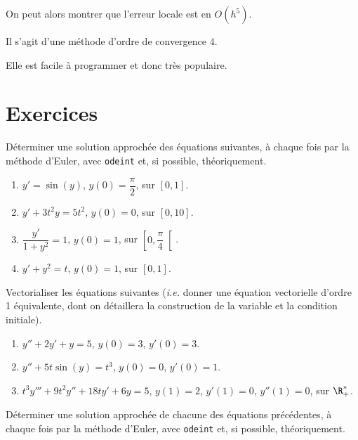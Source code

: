 On peut alors montrer que l'erreur locale est en $O(h^{5})$.

Il s'agit d'une méthode d'ordre de convergence $4$.

Elle est facile à programmer et donc très populaire.

\section{Exercices}

\begin{exo}
  Déterminer une solution approchée des équations suivantes, à chaque fois par la méthode d'Euler, avec \texttt{odeint} et, si possible, théoriquement.
  \begin{enumerate}
    \item $y' = \sin(y)$, $y(0) = \dfrac{\pi}{2}$, sur $[0,1]$.
    \item $y' + 3t^2 y = 5t^2$, $y(0) = 0$, sur $[0,10]$.
    \item $\dfrac{y'}{1+y^2} = 1$, $y(0) = 1$, sur $\left[0,\dfrac{\pi}{4} \right[$.
    \item $y'+y^2=t$, $y(0) = 1$, sur $[0,1]$.
  \end{enumerate}
\end{exo}

\begin{exo}
  Vectorialiser les équations suivantes (\emph{i.e.} donner une équation vectorielle d'ordre 1 équivalente, dont on détaillera la construction de la variable et la condition initiale).
  \begin{enumerate}
    \item $y'' + 2y' + y = 5$, $y(0) = 3$, $y'(0) = 3$.
    \item $y'' + 5t \sin(y) = t^3$, $y(0) = 0$, $y'(0) = 1$.
    \item $t^3y''' + 9t^2y'' + 18ty' + 6y = 5$, $y(1) = 2$, $y'(1) = 0$, $y''(1) = 0$, sur $\R_+^\ast$.  
  \end{enumerate}
\end{exo}

\begin{exo}
  Déterminer une solution approchée de chacune des équations précédentes, à chaque fois par la méthode d'Euler, avec \texttt{odeint} et, si possible, théoriquement.
\end{exo}

